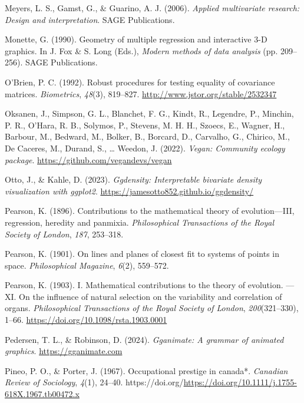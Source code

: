 \documentclass[
  letterpaper,
  10pt,
  krantz2]{krantz}
\newlength{\cslhangindent}
\newenvironment{CSLReferences}[2] %
 {\begin{list}{}{%
  \setlength{\itemindent}{0pt}
  \setlength{\leftmargin}{0pt}
  \setlength{\parsep}{0pt}
  \ifodd #1
   \setlength{\leftmargin}{\cslhangindent}
   \setlength{\itemindent}{-1\cslhangindent}
  \fi
  \setlength{\itemsep}{#2\baselineskip}}}
 {\end{list}}
\begin{document}
\begin{CSLReferences}{1}{0}
Meyers, L. S., Gamst, G., \& Guarino, A. J. (2006). \emph{Applied
multivariate research: Design and interpretation}. SAGE Publications.

Monette, G. (1990). Geometry of multiple regression and interactive
3-{D} graphics. In J. Fox \& S. Long (Eds.), \emph{Modern methods of
data analysis} (pp. 209--256). SAGE Publications.

O'Brien, P. C. (1992). Robust procedures for testing equality of
covariance matrices. \emph{Biometrics}, \emph{48}(3), 819--827.
\url{http://www.jstor.org/stable/2532347}

Oksanen, J., Simpson, G. L., Blanchet, F. G., Kindt, R., Legendre, P.,
Minchin, P. R., O'Hara, R. B., Solymos, P., Stevens, M. H. H., Szoecs,
E., Wagner, H., Barbour, M., Bedward, M., Bolker, B., Borcard, D.,
Carvalho, G., Chirico, M., De Caceres, M., Durand, S., \ldots{} Weedon,
J. (2022). \emph{Vegan: Community ecology package}.
\url{https://github.com/vegandevs/vegan}

Otto, J., \& Kahle, D. (2023). \emph{Ggdensity: Interpretable bivariate
density visualization with ggplot2}.
\url{https://jamesotto852.github.io/ggdensity/}

Pearson, K. (1896). Contributions to the mathematical theory of
evolution---{III}, regression, heredity and panmixia.
\emph{Philosophical Transactions of the Royal Society of London},
\emph{187}, 253--318.

Pearson, K. (1901). On lines and planes of closest fit to systems of
points in space. \emph{Philosophical Magazine}, \emph{6}(2), 559--572.

Pearson, K. (1903). I. Mathematical contributions to the theory of
evolution. ---XI. On the influence of natural selection on the
variability and correlation of organs. \emph{Philosophical Transactions
of the Royal Society of London}, \emph{200}(321--330), 1--66.
\url{https://doi.org/10.1098/rsta.1903.0001}

Pedersen, T. L., \& Robinson, D. (2024). \emph{Gganimate: A grammar of
animated graphics}. \url{https://gganimate.com}

Pineo, P. O., \& Porter, J. (1967). Occupational prestige in canada*.
\emph{Canadian Review of Sociology}, \emph{4}(1), 24--40.
https://doi.org/\url{https://doi.org/10.1111/j.1755-618X.1967.tb00472.x}


\end{CSLReferences}
\end{document}
